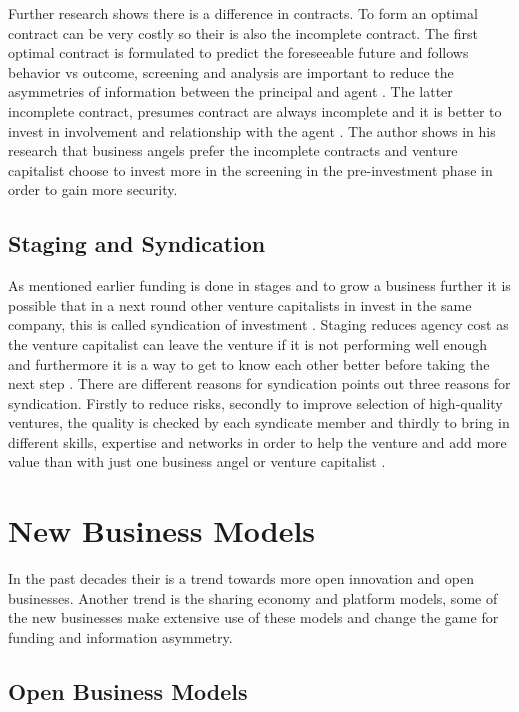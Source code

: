 \documentclass[a4paper, 11pt]{article}
\begin{document}
Further research shows there is a difference in contracts. To form an optimal contract can be very costly so their is also the incomplete contract. The first optimal contract is formulated to predict the foreseeable future and follows behavior vs outcome, screening and analysis are important to reduce the asymmetries of information between the principal and agent \citep{Osnabrugge2000}. The latter incomplete contract, presumes contract are always incomplete and it is better to invest in involvement and relationship with the agent  \citep{Osnabrugge2000}. The author shows in his research that business angels prefer the incomplete contracts and venture capitalist choose to invest more in the screening in the pre-investment phase in order to gain more security.



\subsection{Staging and Syndication}
As mentioned earlier funding is done in stages and to grow a business further it is possible that in a next round other venture capitalists in invest in the same company, this is called syndication of investment \citep{casson2008oxford}. Staging reduces agency cost as the venture capitalist can leave the venture if it is not performing well enough and furthermore it is a way to get to know each other better before taking the next step \citep{colombo2016open}. There are different reasons for syndication  \cite{colombo2016open} points out three reasons for syndication. Firstly to reduce risks, secondly to improve selection of high-quality ventures, the quality is checked by each syndicate member and thirdly to bring in different skills, expertise and networks in order to help the venture and add more value than with just one business angel or venture capitalist \citep{colombo2016open}. 


\section{New Business Models}
In the past decades their is a trend towards more open innovation and open businesses. Another trend is the sharing economy and platform models, some of the new businesses make extensive use of these models and change the game for funding and information asymmetry.

\subsection{Open Business Models}
\end{document}
